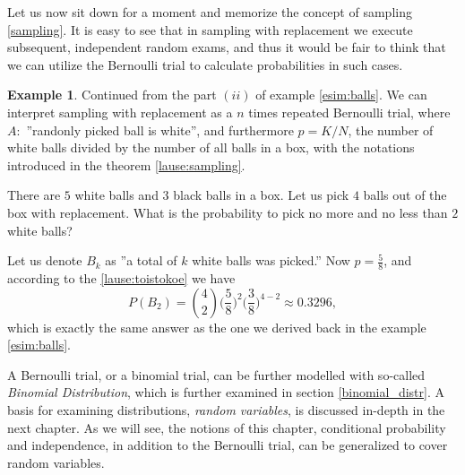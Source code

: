 \documentclass[12pt,a4paper,leqno]{report}
\theoremstyle{plain}
\theoremstyle{definition}
\newtheorem{esim}[equation]{Example}
\begin{document}
Let us now sit down for a moment and memorize the concept of sampling \ref{sampling}. It is easy to see that in sampling with replacement we execute subsequent, independent random exams, and thus it would be fair to think that we can utilize the Bernoulli trial to calculate probabilities in such cases.

\begin{esim}
Continued from the part $(ii)$ of example \ref{esim:balls}. We can interpret sampling with replacement as a $n$ times repeated Bernoulli trial, where $A:$ ''randonly picked ball is white'', and furthermore $p = K/N$, the number of white balls divided by the number of all balls in a box, with the notations introduced in the theorem \ref{lause:sampling}.

There are $5$ white balls and $3$ black balls in a box. Let us pick $4$ balls out of the box with replacement. What is the probability to pick no more and no less than $2$ white balls?

Let us denote $B_k$ as ''a total of $k$ white balls was picked.'' Now $p = \frac{5}{8}$, and according to the \ref{lause:toistokoe} we have
\[
P(B_2) = \binom{4}{2} \Big( \frac{5}{8} \Big) ^2 \Big( \frac{3}{8} \Big) ^{4-2} \approx 0.3296,
\]
which is exactly the same answer as the one we derived back in the example \ref{esim:balls}.
\end{esim}

\bigskip

A Bernoulli trial, or a binomial trial, can be further modelled with so-called  \emph{Binomial Distribution}, which is further examined in section \ref{binomial_distr}. A basis for examining distributions, \emph{random variables}, is discussed in-depth in the next chapter. As we will see, the notions of this chapter, conditional probability and independence, in addition to the Bernoulli trial, can be generalized to cover random variables. 
\end{document}
